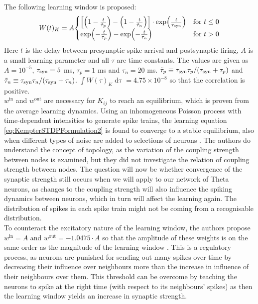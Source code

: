 The following learning window is proposed:
\begin{align}
W(t)_K = A
\begin{cases}
\left[\left(1-\frac{t}{\tilde{\tau}_{p}}\right) - \left(1-\frac{t}{\tilde{\tau}_{n}}\right)\right] \cdot \exp \left( \frac{t}{\tau_{\rm syn}} \right) & \text{for } t \leq 0 \\
 \exp \left(-\frac{t}{\tau_{p}}\right) - \exp \left(-\frac{t}{\tau_{n}} \right) & \text{for } t > 0
\end{cases} \label{eq:learningwindowKempter1999}
\end{align}
Here $t$ is the delay between presynaptic spike arrival and postsynaptic firing, $A$ is a small learning parameter and all $\tau$ are time constants. The values are given as $A = 10^{-5}$, $\tau_{\rm syn} = 5$ ms, $\tau_{p} = 1$ ms and $\tau_{n} = 20$ ms. $\tilde{\tau}_{p} \equiv \tau_{\rm syn} \tau_{p} / (\tau_{\rm syn} + \tau_{p})$ and $\tilde{\tau}_{n} \equiv \tau_{\rm syn} \tau_{n} / (\tau_{\rm syn} + \tau_{n})$. $\int W(\tau)_K \mathop{d \tau} = 4.75 \times 10^{-8}$ so that the correlation is positive. \\

$w^{\mathrm{in}}$ and $w^{\mathrm{out}}$ are necessary for $K_{ij}$ to reach an equilibrium, which is proven from the average learning dynamics. Using an inhomogeneous Poisson process with time-dependent intensities to generate spike trains, the learning equation \eqref{eq:KempterSTDPFormulation2} is found to converge to a stable equilibrium, also when different types of noise are added to selections of neurons \cite{Kempter1999}. The authors do understand the concept of topology, as the variation of the coupling strength between nodes is examined, but they did not investigate the relation of coupling strength between nodes. The question will now be whether convergence of the synaptic strength still occurs when we will apply \STDP to our network of Theta neurons, as changes to the coupling strength will also influence the spiking dynamics between neurons, which in turn will affect the learning again. The distribution of spikes in each spike train might not be coming from a recognisable distribution.\\

To counteract the excitatory nature of the learning window, the authors propose $w^{\mathrm{in}} = A$ and $w^{\mathrm{out}} = -1.0475 \cdot A$ so that the amplitude of these weights is on the same order as the magnitude of the learning window \cite{Kempter1999}. This is a regulatory process, as neurons are punished for sending out  many spikes over time by decreasing their influence over neighbours more than the increase in influence of their neighbours over them. This threshold can be overcome by teaching the neurons to spike at the right time (with respect to its neighbours' spikes) as then the learning window yields an increase in synaptic strength.%


